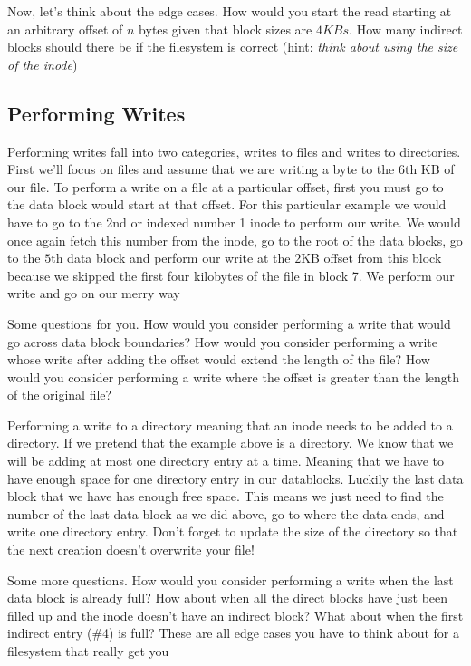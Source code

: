 Now, let's think about the edge cases.
How would you start the read starting at an arbitrary offset of $n$ bytes given that block sizes are $4 KBs$.
How many indirect blocks should there be if the filesystem is correct (hint: \textit{think about using the size of the inode})

\subsection{Performing Writes}

Performing writes fall into two categories, writes to files and writes to directories.
First we'll focus on files and assume that we are writing a byte to the $6$th KB of our file.
To perform a write on a file at a particular offset, first you must go to the data block would start at that offset.
For this particular example we would have to go to the 2nd or indexed number 1 inode to perform our write.
We would once again fetch this number from the inode, go to the root of the data blocks, go to the $5$th data block and perform our write at the $2$KB offset from this block because we skipped the first four kilobytes of the file in block 7.
We perform our write and go on our merry way

Some questions for you. How would you consider performing a write that would go across data block boundaries? How would you consider performing a write whose write after adding the offset would extend the length of the file?  How would you consider performing a write where the offset is greater than the length of the original file?

Performing a write to a directory meaning that an inode needs to be added to a directory.
If we pretend that the example above is a directory.
We know that we will be adding at most one directory entry at a time.
Meaning that we have to have enough space for one directory entry in our datablocks.
Luckily the last data block that we have has enough free space.
This means we just need to find the number of the last data block as we did above, go to where the data ends, and write one directory entry.
Don't forget to update the size of the directory so that the next creation doesn't overwrite your file!

Some more questions. How would you consider performing a write when the last data block is already full? How about when all the direct blocks have just been filled up and the inode doesn't have an indirect block? What about when the first indirect entry (\#4) is full?
These are all edge cases you have to think about for a filesystem that really get you

